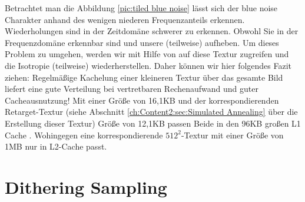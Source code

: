 Betrachtet man die Abbildung \ref{pic:tiled blue noise} lässt sich der blue noise Charakter anhand des
wenigen niederen Frequenzanteils erkennen. Wiederholungen sind in der Zeitdomäne schwerer zu erkennen. 
Obwohl Sie in der Frequenzdomäne erkennbar sind und unsere 
(teilweise) aufheben. Um dieses Problem zu umgehen, werden wir mit Hilfe von 
auf diese Textur zugreifen und die Isotropie (teilweise) wiederherstellen.
Daher können wir hier folgendes Fazit ziehen: Regelmäßige Kachelung einer kleineren  Textur 
über das gesamte Bild liefert eine gute  Verteilung bei vertretbaren Rechenaufwand und guter 
Cacheausnutzung! Mit einer Größe von 16,1KB und der korrespondierenden Retarget-Textur (siehe Abschnitt \ref{ch:Content2:sec:Simulated Annealing}
über die Erstellung dieser Textur) Größe von 12,1KB passen Beide in den 96KB großen L1 Cache \cite{turingarchitecture}. Wohingegen 
eine korrespondierende $512^{2}$-Textur mit einer Größe von 1MB nur in L2-Cache passt.

\section{Dithering Sampling}
\label{ch:Content1:sec:blue noise sampling}

